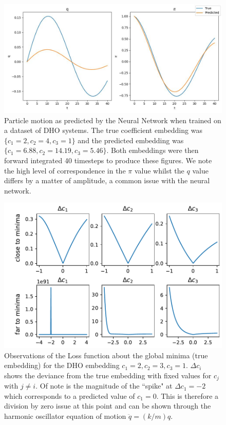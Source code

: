 \documentclass[10pt]{iopart}
\begin{document}
\begin{figure}
	\centering
	\includegraphics[width=\textwidth]{modelComp.jpg}
	\caption{Particle motion as predicted by the Neural Network when trained on a dataset of DHO systems. The true coefficient embedding was $\{c_1=2,c_2=4,c_3=1\}$ and the predicted embedding was$\{c_1=6.88,c_2=14.19,c_3=5.46\}$. Both embeddings were then forward integrated 40 timesteps to produce these figures. We note the high level of correspondence in the $\pi$ value whilst the $q$ value differs by a matter of amplitude, a common issue with the neural network.}
		\label{model_comp}
\end{figure}

\begin{figure}
	\centering
	\includegraphics[width=\columnwidth]{loss-function-behaviour.pdf}
	\caption{Observations of the Loss function about the global minima (true embedding) for the DHO embedding ${c_1=2,c_2=3,c_3=1}$. $\Delta c_i$ shows the deviance from the true embedding with fixed values for $c_j$ with $j\neq i$. Of note is the magnitude of the ``spike" at $\Delta c_1 = -2$ which corresponds to a predicted value of $c_1 =0$. This is therefore a division by zero issue at this point and can be shown through the harmonic oscillator equation of motion $\ddot q = (k/m) q$.}
		\label{lossSlices}
\end{figure}
\end{document}
